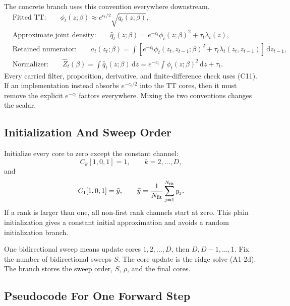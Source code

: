 \documentclass[11pt]{article}
\newcommand{\dd}{\,\mathrm d}
\begin{document}
The concrete branch uses this convention everywhere downstream.
\[
\boxed{
\begin{aligned}
&\text{Fitted TT:}\qquad
  \phi_t(z;\beta)\approx e^{c_t/2}\sqrt{\widetilde q_t(z;\beta)},\\
&\text{Approximate joint density:}\qquad
  \widehat q_t(z;\beta)
  =
  e^{-c_t}\phi_t(z;\beta)^2+\tau_t\lambda_t(z),\\
&\text{Retained numerator:}\qquad
  a_t(z_t;\beta)
  =
  \int
  \left[e^{-c_t}\phi_t(z_t,z_{t-1};\beta)^2
        +\tau_t\lambda_t(z_t,z_{t-1})\right]\dd z_{t-1},\\
&\text{Normalizer:}\qquad
  \widehat Z_t(\beta)
  =
  \int \widehat q_t(z;\beta)\dd z
  =
  e^{-c_t}\int\phi_t(z;\beta)^2\dd z+\tau_t.
\end{aligned}}
\tag{C11}
\]
Every carried filter, proposition, derivative, and finite-difference check uses
(C11).  If an implementation instead absorbs \(e^{-c_t/2}\) into the TT cores,
then it must remove the explicit \(e^{-c_t}\) factors everywhere.  Mixing the
two conventions changes the scalar.

\subsection{Initialization And Sweep Order}

Initialize every core to zero except the constant channel:
\[
    C_k[1,0,1]=1,\qquad k=2,\ldots,D,
\]
and
\[
    C_1[1,0,1]=\bar y,\qquad
    \bar y=\frac1{N_{\rm fit}}\sum_{j=1}^{N_{\rm fit}}y_j.
\]
If a rank is larger than one, all non-first rank channels start at zero.  This
plain initialization gives a constant initial approximation and avoids a random
initialization branch.

One bidirectional sweep means update cores \(1,2,\ldots,D\), then
\(D,D-1,\ldots,1\).  Fix the number of bidirectional sweeps \(S\).  The core
update is the ridge solve (A1-2d).  The branch stores the sweep order, \(S\),
\(\rho\), and the final cores.

\subsection{Pseudocode For One Forward Step}
\end{document}
